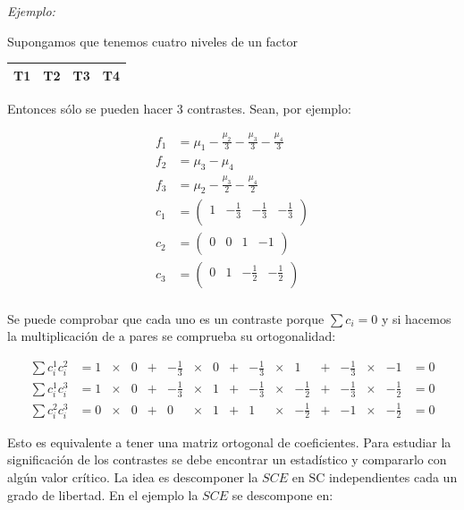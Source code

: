 \documentclass[]{book}
\theoremstyle{definition}
\theoremstyle{definition}
\theoremstyle{definition}
\theoremstyle{remark}
\begin{document}
\emph{Ejemplo:}

Supongamos que tenemos cuatro niveles de un factor

\begin{longtable}[]{@{}llll@{}}
\toprule
T1 & T2 & T3 & T4\tabularnewline
\midrule
\endhead
\bottomrule
\end{longtable}

Entonces sólo se pueden hacer 3 contrastes. Sean, por ejemplo:

\[
\begin{aligned}
f_{1} &= \mu_{1} - \frac{\mu_{2}}{3} - \frac{\mu_{3}}{3} - \frac{\mu_{4}}{3} \\
f_{2} &= \mu_{3} - \mu_{4} \\
f_{3} &= \mu_{2} - \frac{\mu_{3}}{2} - \frac{\mu_{4}}{2} \\
c_{1} &= \begin{pmatrix}
1 & - \frac{1}{3} & - \frac{1}{3} & - \frac{1}{3} \\
\end{pmatrix} \\
c_{2} &= \begin{pmatrix}
0 & 0 & 1 & - 1 \\
\end{pmatrix} \\
c_{3} &= \begin{pmatrix}
0 & 1 & - \frac{1}{2} & - \frac{1}{2} \\
\end{pmatrix} \\
\end{aligned}
\]

Se puede comprobar que cada uno es un contraste porque \(\sum{c_i}=0\) y
si hacemos la multiplicación de a pares se comprueba su ortogonalidad:

\[
\begin{aligned}
\sum{c_i^1c_i^2} &= 1 &\times & 0 & + & -\frac{1}{3} & \times & 0 & + & -\frac{1}{3} &\times & 1            & + & -\frac{1}{3} & \times & -1           &= 0 \\
\sum{c_i^1c_i^3} &= 1 &\times & 0 & + & -\frac{1}{3} & \times & 1 & + & -\frac{1}{3} &\times & -\frac{1}{2} & + & -\frac{1}{3} & \times & -\frac{1}{2} &= 0\\
\sum{c_i^2c_i^3} &= 0 &\times & 0 & + & 0            & \times & 1 & + & 1            &\times & -\frac{1}{2} & + & -1           & \times & -\frac{1}{2} &= 0
\end{aligned}
\]

Esto es equivalente a tener una matriz ortogonal de coeficientes. Para
estudiar la significación de los contrastes se debe encontrar un
estadístico y compararlo con algún valor crítico. La idea es descomponer
la \(SCE\) en \(\text{SC}\) independientes cada un grado de libertad. En
el ejemplo la \(SCE\) se descompone en:
\end{document}
